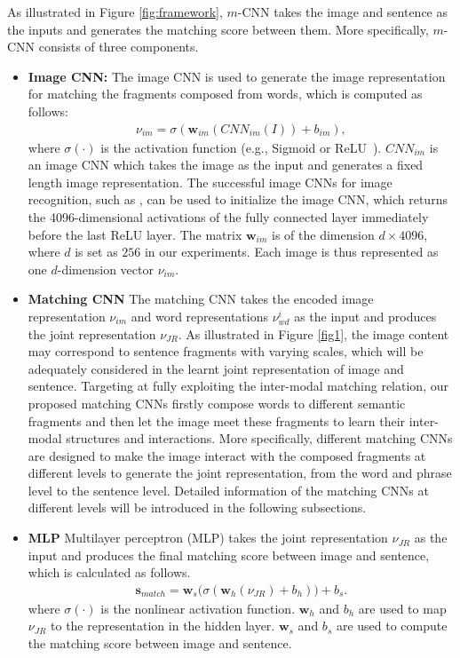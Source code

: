 \documentclass[10pt,twocolumn,letterpaper]{article}
\begin{document}
As illustrated in Figure \ref{fig:framework}, $m$-CNN takes the image and sentence as the inputs and generates the matching score between them. More specifically, $m$-CNN consists of three components.
\vspace{-5pt}
\begin{itemize}
  \item {\bf Image CNN:} The image CNN is used to generate the image representation for matching the fragments composed from words, which is computed as follows:
\begin{equation}
\label{eq_image_cnn}
\begin{split}
\nu_{im} = \sigma(\mathbf{w}_{im}(CNN_{im}(I))+b_{im}),
\end{split}
\end{equation}
where $\sigma(\cdot)$ is the activation function (e.g., Sigmoid or ReLU~\cite{relu}). $CNN_{im}$ is an image CNN which takes the image as the input and generates a fixed length image representation. The successful image CNNs for image recognition, such as \cite{sermanet_arxiv2014,simonyan_arxiv2014}, can be used to initialize the image CNN, which returns the 4096-dimensional activations of the fully connected layer immediately before the last ReLU layer. The matrix $\mathbf{w}_{im}$ is of the dimension $d\times4096$, where $d$ is set as $256$ in our experiments. Each image is thus represented as one $d$-dimension vector $\nu_{im}$.
\item {\bf Matching CNN}  The matching CNN takes the encoded image representation $\nu_{im}$ and word representations $\nu_{wd}^i$ as the input and produces the joint representation $\nu_{JR}$. As illustrated in Figure \ref{fig1}, the image content may correspond to sentence fragments with varying scales, which will be adequately considered in the learnt joint representation of image and sentence. Targeting at fully exploiting the inter-modal matching relation, our proposed matching CNNs firstly compose words to different semantic  fragments and then let the image meet these fragments to learn their inter-modal structures and interactions. More specifically, different matching CNNs are designed to make the image interact with the composed fragments at different levels to generate the joint representation, from the word and phrase level to the sentence level. Detailed information of the matching CNNs at different levels will be introduced in the following subsections.
\item {\bf MLP} Multilayer perceptron (MLP) takes the joint representation $\nu_{JR}$ as the input and produces the final matching score between image and sentence, which is calculated as follows.
\begin{equation}
\label{eq_mlp}
\begin{split}
\mathbf{s}_{match} = \mathbf{w}_{s}\big( \sigma(\mathbf{w}_{h}(\nu_{JR})+b_{h})\big )+b_{s}.
\end{split}
\end{equation}
where $\sigma(\cdot)$ is the nonlinear activation function. $\mathbf{w}_{h}$ and $b_{h}$ are used to map $\nu_{JR}$ to the representation in the hidden layer. $\mathbf{w}_{s}$ and $b_{s}$ are used to compute the matching score between image and sentence.


\end{itemize}
\end{document}
